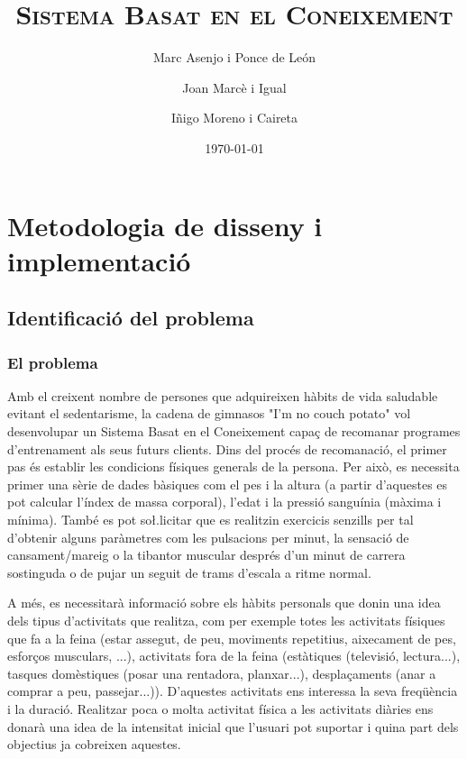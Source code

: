 \documentclass[a4paper, 12pt]{article}
\begin{document}
\title{\textsc{Sistema Basat en el Coneixement}}
\author{Marc Asenjo i Ponce de León \and
	Joan Marcè i Igual \and
	Iñigo Moreno i Caireta}
\date{\today}
\maketitle

\section{Metodologia de disseny i implementació}

\subsection{Identificació del problema}

\subsubsection{El problema}

Amb el creixent nombre de persones que adquireixen hàbits de vida saludable evitant el sedentarisme, la cadena de gimnasos "I'm no couch potato" vol desenvolupar un Sistema Basat en el Coneixement capaç de recomanar programes d'entrenament als seus futurs clients. Dins del procés de recomanació, el primer pas és establir les condicions físiques generals de la persona. Per això, es necessita primer una sèrie de dades bàsiques com el pes i la altura (a partir d'aquestes es pot calcular l'índex de massa corporal), l'edat i la pressió sanguínia (màxima i mínima). També es pot so\l.licitar que es realitzin exercicis senzills per tal d'obtenir alguns paràmetres com les pulsacions per minut, la sensació de cansament/mareig o la tibantor muscular després d'un minut de carrera sostinguda o de pujar un seguit de trams d'escala a ritme normal. 

A més, es necessitarà informació sobre els hàbits personals que donin una idea dels tipus d'activitats que realitza, com per exemple totes les activitats físiques que fa a la feina (estar assegut, de peu, moviments repetitius, aixecament de pes, esforços musculars, ...), activitats fora de la feina (estàtiques (televisió, lectura...), tasques domèstiques (posar una rentadora, planxar...), desplaçaments (anar a comprar a peu, passejar...)). D'aquestes activitats ens interessa la seva freqüència i la duració. Realitzar poca o molta activitat física a les activitats diàries ens donarà una idea de la intensitat inicial que l'usuari pot suportar i quina part dels objectius ja cobreixen aquestes. 
\end{document}
